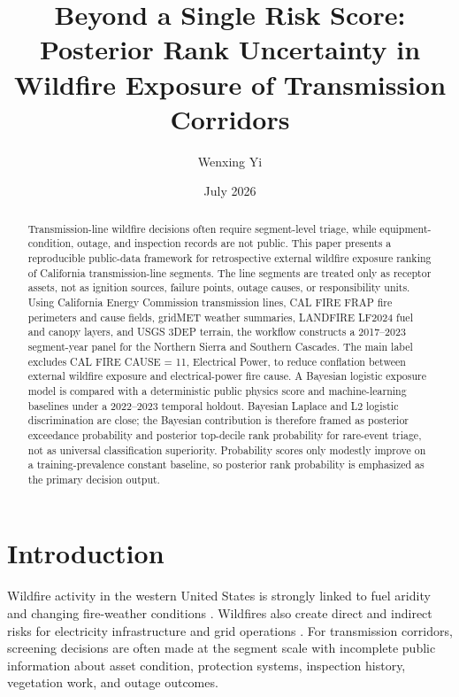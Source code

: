 \documentclass[11pt]{article}
\title{Beyond a Single Risk Score: Posterior Rank Uncertainty in Wildfire Exposure of Transmission Corridors}
\author{Wenxing Yi}
\date{July 2026}
\begin{document}
\maketitle

\begin{abstract}
Transmission-line wildfire decisions often require segment-level triage, while
equipment-condition, outage, and inspection records are not public. This paper
presents a reproducible public-data framework for retrospective external
wildfire exposure ranking of California transmission-line segments. The line
segments are treated only as receptor assets, not as ignition sources, failure
points, outage causes, or responsibility units. Using California Energy
Commission transmission lines, CAL FIRE FRAP fire perimeters and cause fields,
gridMET weather summaries, LANDFIRE LF2024 fuel and canopy layers, and USGS
3DEP terrain, the workflow constructs a 2017--2023 segment-year panel for the
Northern Sierra and Southern Cascades. The main label excludes CAL FIRE CAUSE =
11, Electrical Power, to reduce conflation between external wildfire exposure
and electrical-power fire cause. A Bayesian logistic exposure model is compared
with a deterministic public physics score and machine-learning baselines under
a 2022--2023 temporal holdout. Bayesian Laplace and L2 logistic discrimination
are close; the Bayesian contribution is therefore framed as posterior
exceedance probability and posterior top-decile rank probability for rare-event
triage, not as universal classification superiority. Probability scores only
modestly improve on a training-prevalence constant baseline, so posterior rank
probability is emphasized as the primary decision output.
\end{abstract}

\section{Introduction}

Wildfire activity in the western United States is strongly linked to fuel
aridity and changing fire-weather conditions
\citep{abatzoglouWilliams2016wildfire}. Wildfires also create direct and
indirect risks for electricity infrastructure and grid operations
\citep{dale2018californiaGrid,panossianElgindy2023wildfire}. For transmission
corridors, screening decisions are often made at the segment scale with
incomplete public information about asset condition, protection systems,
inspection history, vegetation work, and outage outcomes.
\end{document}
